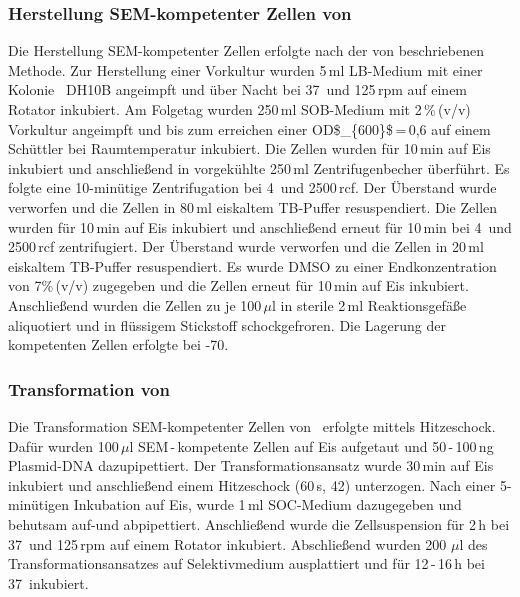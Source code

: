 \subsubsection{Herstellung \acs{SEM}-kompetenter Zellen von \Ecoli }
Die Herstellung \acs{SEM}-kompetenter Zellen erfolgte nach der von \citet{Inoue.1990} beschriebenen Methode.
Zur Herstellung einer Vorkultur wurden 5\,ml LB-Medium mit einer Kolonie \Ecoli\ DH10B angeimpft und über Nacht bei 37\celcius\ und 125\,\acs{rpm} auf einem Rotator inkubiert. Am Folgetag wurden 250\,ml SOB-Medium mit 2\,\%\,(v/v) Vorkultur angeimpft und bis zum erreichen einer \acs{OD$_{600}$}\,=\,0,6 auf einem Schüttler bei Raumtemperatur inkubiert. Die Zellen wurden für 10\,min auf Eis inkubiert und anschließend in vorgekühlte 250\,ml Zentrifugenbecher überführt. Es folgte eine 10-minütige Zentrifugation bei 4\celcius\ und 2500\,\acs{rcf}. Der Überstand wurde verworfen und die Zellen in 80\,ml eiskaltem TB-Puffer resuspendiert. Die Zellen wurden für 10\,min auf Eis inkubiert und anschließend erneut für 10\,min bei 4\celcius\ und 2500\,\acs{rcf} zentrifugiert. Der Überstand wurde verworfen und die Zellen in 20\,ml eiskaltem TB-Puffer resuspendiert. Es wurde \acs{DMSO} zu einer Endkonzentration von 7\%\,(v/v) zugegeben und die Zellen erneut für 10\,min auf Eis inkubiert. Anschließend wurden die Zellen zu je 100\,$\mu$l in sterile 2\,ml Reaktionsgefäße aliquotiert und in flüssigem Stickstoff schockgefroren. Die Lagerung der kompetenten Zellen erfolgte bei -70\celcius.      
\subsubsection{Transformation von \Ecoli}
Die Transformation SEM-kompetenter Zellen von \Ecoli\ erfolgte mittels Hitzeschock.
Dafür wurden 100\,$\mu$l SEM\,-\,kompetente Zellen auf Eis aufgetaut und 50\,-\,100\,ng Plasmid-DNA dazupipettiert. Der Transformationsansatz wurde 30\,min auf Eis inkubiert und anschließend einem Hitzeschock (60\,s, 42\celcius) unterzogen. Nach einer 5-minütigen Inkubation auf Eis, wurde 1\,ml SOC-Medium dazugegeben und behutsam auf-und abpipettiert. Anschließend wurde die Zellsuspension für 2\,h bei 37\celcius\ und 125\,rpm auf einem Rotator inkubiert. Abschließend wurden 200\,\,$\mu$l des Transformationsansatzes auf Selektivmedium ausplattiert und für 12\,-\,16\,h bei 37\celcius\ inkubiert. 
